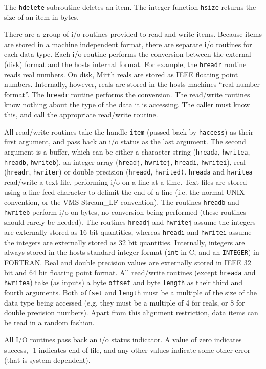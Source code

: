 The {\tt hdelete} subroutine deletes an item.
The integer function {\tt hsize} returns the size of an item in bytes.

There are a group of i/o routines provided to read and write items. Because
items are stored in a machine independent format, there are separate i/o
routines for each data type.  Each i/o routine performs the conversion between
the external (disk) format and the hosts internal format. For example, the
{\tt hreadr} routine reads real numbers. On disk, Mirth reals are stored
as IEEE floating point numbers. Internally, however, reals are stored in the
hosts machines ``real number format''. The {\tt hreadr} routine performs the
conversion. The read/write
routines know nothing about the type of the data it is accessing. The
caller must know this, and call the appropriate read/write routine.

All read/write routines take the handle {\tt item} (passed back by
{\tt haccess}) as their first argument, and pass back an i/o status as the last
argument. The second argument is a buffer, which can be either a character
string ({\tt hreada}, {\tt hwritea}, {\tt hreadb}, {\tt hwriteb}), an integer
array ({\tt hreadj}, {\tt hwritej}, {\tt hreadi}, {\tt hwritei}),
real ({\tt hreadr}, {\tt hwriter}) or double precision
({\tt hreadd}, {\tt hwrited)}. {\tt hreada} and {\tt hwritea} read/write
a text file,
performing i/o on a line at a time. Text files are stored using a line-feed
character to delimit the end of a line (i.e. the normal UNIX convention, or the
VMS Stream\_LF convention). The routines {\tt hreadb} and {\tt hwriteb} perform
i/o on bytes, no conversion being performed (these routines should rarely be
needed). The routines {\tt hreadj} and {\tt hwritej} assume the integers are
externally stored as 16 bit quantities, whereas {\tt hreadi} and {\tt hwritei}
assume the integers are externally stored as 32 bit quantities. Internally,
integers are always stored in the hosts standard integer format ({\tt int}
in C, and an {\tt INTEGER}) in FORTRAN. Real and double
precision values are externally stored in IEEE 32 bit and 64 bit floating point
format. All read/write routines (except {\tt hreada} and {\tt hwritea}) take
(as inputs) a byte {\tt offset} and byte {\tt length} as their third and fourth
arguments. Both {\tt offset} and {\tt length} must be a multiple of the size
of the data type being accessed (e.g. they must be a multiple of 4 for
reals, or 8 for double precision numbers). Apart from this alignment
restriction, data items can be read in a random fashion.

All I/O routines pass back an i/o status indicator. A value of zero
indicates success, -1 indicates end-of-file, and any other values indicate
some other error (that is system dependent).
